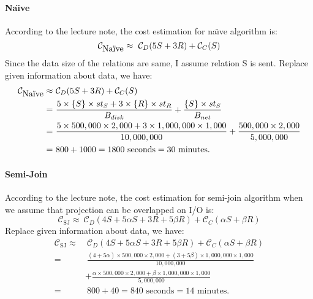 \documentclass[a4paper,12pt]{article}
\begin{document}
\paragraph{Na\"{\i}ve} According to the lecture note, the cost estimation for na\"{\i}ve algorithm is:
$$ \mathcal{C}_{\mbox{Na\"{\i}ve}} \approx \ \mathcal{C}_D(5S + 3R) + \mathcal{C}_C(S)$$
Since the data size of the relations are same, I assume relation S is sent. Replace given information about data, we have:
\begin{equation*}
	\begin{aligned}
		\mathcal{C}_{\mbox{Na\"{\i}ve}} \approx & \ \mathcal{C}_D(5S + 3R) + \mathcal{C}_C(S) \\
		= & \ \frac{5 \times \{S\} \times st_S + 3 \times \{R\} \times st_R}{B_{disk}} + \frac{\{S\} \times st_S}{B_{net}} \\
		= & \ \frac{5 \times 500,000 \times 2,000 + 3 \times 1,000,000 \times 1,000}{10,000,000} + \frac{500,000 \times 2,000}{5,000,000} \\
		= & \ 800 + 1000 = 1800\mbox{ seconds} = 30\mbox{ minutes}.
	\end{aligned}
\end{equation*}
\pagebreak

\paragraph{Semi-Join} According to the lecture note, the cost estimation for semi-join algorithm when we assume that projection can be overlapped on I/O is:
$$ \mathcal{C}_{\mbox{SJ}} \approx \ \mathcal{C}_D(4S + 5 \alpha S + 3R + 5 \beta R) + \mathcal{C}_C(\alpha S + \beta R)$$
Replace given information about data, we have:
\begin{equation*}
	\begin{aligned}
		\mathcal{C}_{\mbox{SJ}} \approx & \ \mathcal{C}_D(4S + 5 \alpha S + 3R + 5 \beta R) + \mathcal{C}_C(\alpha S + \beta R) \\
		= & \ \frac{(4 + 5\alpha) \times 500,000 \times 2,000 + (3 + 5 \beta) \times 1,000,000 \times 1,000}{10,000,000}  \\
		& + \frac{\alpha \times 500,000 \times 2,000 + \beta \times 1,000,000 \times 1,000}{5,000,000} \\
		= & \ 800 + 40 = 840\mbox{ seconds} = 14\mbox{ minutes}.
	\end{aligned}
\end{equation*}
\end{document}
